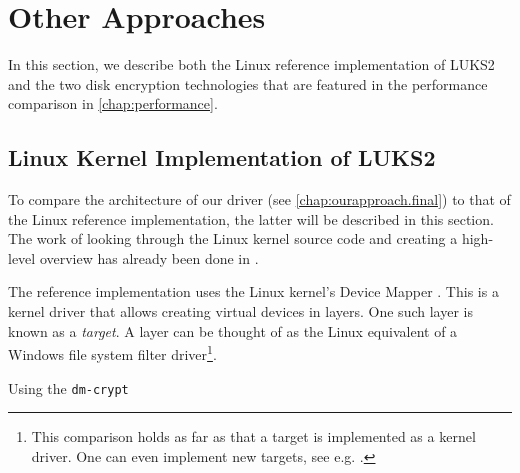 \section{Other Approaches}
\label{chap:otherapproaches}
In this section, we describe both the Linux reference implementation of LUKS2 and the two disk encryption technologies that are featured in the performance comparison in \autoref{chap:performance}.

\subsection{Linux Kernel Implementation of LUKS2}
\label{chap:otherapproaches.linux}
To compare the architecture of our driver (see \autoref{chap:ourapproach.final}) to that of the Linux reference implementation, the latter will be described in this section. \\ The work of looking through the Linux kernel source code and creating a high-level overview has already been done in \cite{Korchagin2020}.

The reference implementation uses the Linux kernel's Device Mapper \cite{Dmcrypt2020}. This is a kernel driver that allows creating virtual devices in layers. One such layer is known as a \emph{target}. A layer can be thought of as the Linux equivalent of a Windows file system filter driver\footnote{\label{fn:otherapproaches.linux.dmtargetdriver} This comparison holds as far as that a target is implemented as a kernel driver. One can even implement new targets, see e.g. \cite{Barker2019}.}. 


Using the \texttt{dm-crypt} 



